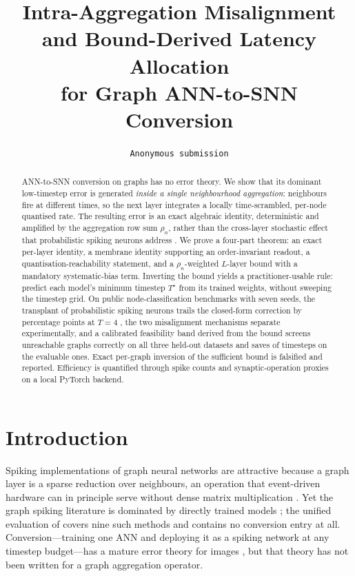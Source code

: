 \documentclass[10pt,twocolumn]{article}
\title{\textbf{Intra-Aggregation Misalignment and Bound-Derived Latency Allocation\\
for Graph ANN-to-SNN Conversion}}
\author{\texttt{Anonymous submission}}
\date{}
\newcommand{\Tstar}{T^{\star}}
\newcommand{\rhon}{\rho_n}
\begin{document}
\maketitle
\begin{abstract}
ANN-to-SNN conversion on graphs has no error theory. We show that its dominant low-timestep error
is generated \emph{inside a single neighbourhood aggregation}: neighbours fire at different times,
so the next layer integrates a locally time-scrambled, per-node quantised rate. The resulting
error is an exact algebraic identity, deterministic and amplified by the aggregation row sum
$\rhon$, rather than the cross-layer stochastic effect that probabilistic spiking neurons address
\cite{tpp2025}. We prove a four-part theorem: an exact per-layer identity, a membrane
identity supporting an order-invariant readout, a quantisation-reachability statement, and a
$\rhon$-weighted $L$-layer bound with a mandatory systematic-bias term. Inverting the bound yields
a practitioner-usable rule: predict each model's minimum timestep $\Tstar$ from its trained weights,
without sweeping the timestep grid. On public node-classification benchmarks with seven seeds,
the transplant of probabilistic spiking neurons trails the closed-form correction by
\soneTppGap{} percentage points at $T{=}4$ %
, the two misalignment mechanisms separate experimentally, and a calibrated feasibility band derived from the bound screens unreachable graphs
correctly on all three held-out datasets and saves \cthreeSaving{} of timesteps on the evaluable
ones. Exact per-graph inversion of the sufficient bound is falsified and reported. %
Efficiency is quantified through spike counts and synaptic-operation proxies on a local PyTorch backend.
\end{abstract}

\section{Introduction}
\label{sec:intro}

Spiking implementations of graph neural networks are attractive because a graph layer is a sparse
reduction over neighbours, an operation that event-driven hardware can in principle serve without
dense matrix multiplication \cite{spikingjelly2023,survey2024}. Yet the graph spiking literature
is dominated by directly trained models \cite{spikinggcn2022,gcsnn2021,spikegcl2024,%
spikegraphormer2024,msgnn2024,drsgnn2024,signn2025,geometry2025,spikestag2025,gtsnt2025,%
hetero2026,chronospike2026,spikenet2023}; the unified evaluation of \cite{sgnnbench2025} covers
nine such methods and contains no conversion entry at all. Conversion---training one ANN and
deploying it as a spiking network at any timestep budget---has a mature error theory for images
\cite{qcfs2022,residual2023,ftbc2024,tpp2025}, but that theory has not been written for a graph
aggregation operator.
\end{document}
